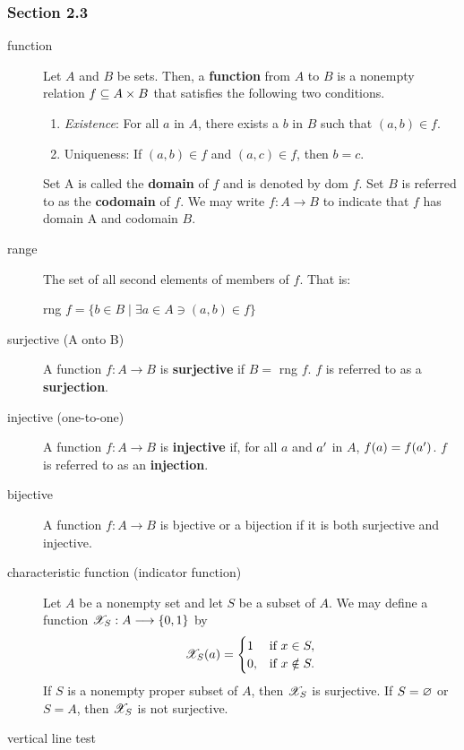 \documentclass[12pt]{article}
\begin{document}
\subsubsection{Section 2.3}
\label{sec:org45d01fa}
\begin{description}
\item[{function}] Let \(A\) and \(B\) be sets. Then, a \textbf{function} from \(A\) to \(B\) is a
nonempty relation \(f\subseteq{}A\times{}B\) that satisfies the following two
conditions.
\begin{enumerate}
\item \emph{Existence}: For all \(a\) in \(A\), there exists a \(b\) in \(B\) such that
\((a,b)\in{}f\).
\item Uniqueness: If \((a,b)\in{}f\) and \((a,c)\in{}f\), then \(b=c\).
\end{enumerate}
Set A is called the \textbf{domain} of \(f\) and is denoted by dom \(f\). Set \(B\) is
            referred to as the \textbf{codomain} of \(f\). We may write
            \(f:A\longrightarrow{}B\) to indicate that \(f\) has domain A and
            codomain \(B\).
\item[{range}] The set of all second elements of members of \(f\). That is:
\begin{center}
rng \(f = \{b\in{}B\mid{}\exists{}a\in{}A\ni(a,b)\in{}f\}\)
\end{center}
\item[{surjective (A onto B)}] A function \(f:A\longrightarrow{}B\) is \textbf{surjective} if
\(B=\) rng \(f\). \(f\) is referred to as a \textbf{surjection}.
\item[{injective (one-to-one)}] A function \(f:A\longrightarrow{}B\) is \textbf{injective} if,
for all \(a\) and \(a'\) in \(A\), \(f(a)=f(a')\). \(f\) is referred to as an
\textbf{injection}.
\item[{bijective}] A function \(f:A\longrightarrow{}B\) is bjective or a bijection if
it is both surjective and injective.
\item[{characteristic function (indicator function)}] Let \(A\) be a nonempty set and
let \(S\) be a subset of \(A\). We may define a function
\(\mathscr{X}_S:A\longrightarrow{}\{0,1\}\) by
\[\indX_S(a)= 
  \begin{cases} 
    1 & $if $x\in{}S,  \\
    0, & $if $x\notin{}S.
  \end{cases} \]
If \(S\) is a nonempty proper subset of \(A\), then \(\mathscr{X}_S\) is surjective. If
   \(S=\varnothing\) or \(S=A\), then \(\mathscr{X}_S\) is not surjective.
\item[{vertical line test}] 


\end{description}
\end{document}
